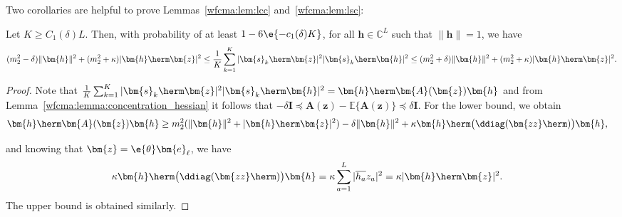 Two corollaries are helpful to prove Lemmas~\ref{wfcma:lem:lcc} and~\ref{wfcma:lem:lsc}:
\begin{cor} \label{wfcma:cor:absabs} %
	Let $K\geq C_1(\delta)L$. Then, with probability of at least $1-6\e{-c_1(\delta)K}$, for all $\bm{h}\in\mathbb{C}^L$ such that $\|\bm{h}\|=1$, we have
	\begin{align}
		(m_2^2 - \delta)\|\bm{h}\|^2 + (m_2^2+\kappa)|\bm{h}\herm\bm{z}|^2 
		\leq   \frac{1}{K}\sum_{k=1}^K|\bm{s}_k\herm\bm{z}|^2|\bm{s}_k\herm\bm{h}|^2 
		\leq(m_2^2 +\delta)\|\bm{h}\|^2 + (m_2^2+\kappa)|\bm{h}\herm\bm{z}|^2. \nonumber%
	\end{align}
\end{cor}
\begin{proof}
	Note that 
	$
	\frac{1}{K}\sum_{k=1}^K|\bm{s}_k\herm\bm{z}|^2|\bm{s}_k\herm\bm{h}|^2=\bm{h}\herm\bm{A}(\bm{z})\bm{h} \nonumber
	$
	and from Lemma~\ref{wfcma:lemma:concentration_hessian} it follows that $-\delta\bm{I}\preceq\textbf{}\bm{A}(\bm{z})-\mathbb{E}\{\bm{A}(\bm{z})\}\preceq\delta\bm{I}$. For the lower bound, we obtain
	\begin{align}
		\bm{h}\herm\bm{A}(\bm{z})\bm{h}&
		\geq m_2^2(\|\bm{h}\|^2+|\bm{h}\herm\bm{z}|^2) - \delta\|\bm{h}\|^2
		+\kappa \bm{h}\herm\big(\ddiag(\bm{zz}\herm)\big)\bm{h},\nonumber %
	\end{align}
	
	and knowing that $\bm{z}=\e{\theta}\bm{e}_{\ell}$, we have
	\begin{align}
		&\kappa \bm{h}\herm\big(\ddiag(\bm{zz}\herm)\big)\bm{h}=\kappa \sum_{a=1}^L|\overline{h_a}z_a|^2=\kappa|\bm{h}\herm\bm{z}|^2.\nonumber%
	\end{align}
	The upper bound is obtained similarly.
\end{proof}

